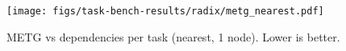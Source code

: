 \begin{figure}[t]
\centering
\texttt{[image: figs/task-bench-results/radix/metg\_nearest.pdf]}
\vspace{-0.6cm}
\caption{METG vs dependencies per task (nearest, 1 node). Lower is better.\label{fig:radix}}
\vspace{-0.1cm}
\end{figure}
